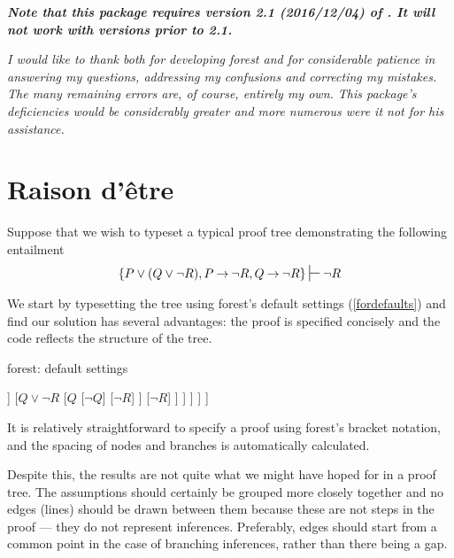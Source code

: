 \documentclass[10pt,british,a4paper,doc2]{ltxdoc}
\newcommand*\pkg[1]{\textsf{#1}}
\newcommand*{\lif}{\ensuremath{\mathbin{\rightarrow}}}
\begin{document}
\emph{\bfseries Note that this package requires version 2.1 (2016/12/04) of \keyname[pkg]{\pkg{forest}} \autocite{saso-forest-manual}.
  It will not work with versions prior to 2.1.}
\bigskip

\emph{I would like to thank \citeauthor{saso-forest-manual} both for developing \pkg{forest} and for considerable patience in answering my questions, addressing my confusions and correcting my mistakes.
The many remaining errors are, of course, entirely my own.
This package's deficiencies would be considerably greater and more numerous were it not for his assistance.}


\clearpage

\tableofcontents

\section{Raison d'être}\label{sec:raisondetre}

Suppose that we wish to typeset a typical proof tree demonstrating the following entailment
\[
  \{P \vee (Q \vee \lnot R), P \lif \lnot R, Q \lif \lnot R\} \sststile{}{} \lnot R
\]

We start by typesetting the tree using \pkg{forest}'s default settings (\cref{fordefaults}) and find our solution has several advantages: the proof is specified concisely and the code reflects the structure of the tree.
\begin{codcoeden}[label=fordefaults,floatplacement=bp!]{\pkg{forest}: default settings}
\begin{forest}
  [$P \vee (Q \vee \lnot R)$
    [$P \lif \lnot R$
      [$Q \lif \lnot R$
        [$\lnot\lnot R$
          [$P$
            [$\lnot P$]
            [$\lnot R$]
          ]
          [$Q \vee \lnot R$
            [$Q$
              [$\lnot Q$]
              [$\lnot R$]
            ]
            [$\lnot R$]
          ]
        ]
      ]
    ]
  ]
\end{forest}
\end{codcoeden}
It is relatively straightforward to specify a proof using \pkg{forest}'s bracket notation, and the spacing of nodes and branches is automatically calculated.

Despite this, the results are not quite what we might have hoped for in a proof tree.
The assumptions should certainly be grouped more closely together and no edges (lines) should be drawn between them because these are not steps in the proof --- they do not represent inferences.
Preferably, edges should start from a common point in the case of branching inferences, rather than there being a gap.
\end{document}
